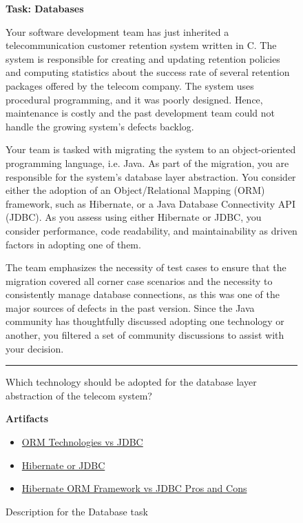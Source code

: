 \begin{figure}
\begin{mdframed}[backgroundcolor=gray!04] 
\begin{scriptsize}

{\large \textbf{Task: Databases}} \bigskip


Your software development team has just inherited a telecommunication customer retention system written in C. The system is responsible for creating and updating retention policies and computing
statistics about the success rate of several retention packages offered by the telecom company. The system uses procedural programming, and it was poorly designed. Hence, maintenance is costly and the
past development team could not handle the growing system's defects backlog. \medskip


Your team is tasked with migrating the system to an object-oriented programming language, i.e. Java. As part of the migration, you are responsible for the system's database layer abstraction. You consider either the adoption of an Object/Relational Mapping (ORM) framework, such as Hibernate, or a Java Database Connectivity API (JDBC). As you assess using either Hibernate or JDBC, you consider performance,
code readability, and maintainability as driven factors in adopting one of them.  \medskip

The team emphasizes the necessity of test cases to ensure that the migration covered all corner case scenarios and the necessity to consistently manage database connections, as this was one of the major sources of defects in the past version. Since the Java community has thoughtfully discussed adopting one technology or another, you filtered a set of community discussions to assist with your decision.


\begin{center}
\rule{10cm}{0.4pt}
\end{center}

Which technology should be adopted for the database layer abstraction of the telecom system?

\medskip

\textbf{Artifacts}

\begin{itemize}
    \item \href{https://stackoverflow.com/questions/1575762/orm-technologies-vs-jdbc}{ORM Technologies vs JDBC}
    \item \href{https://stackoverflow.com/questions/1353137/hibernate-or-jdbc}{Hibernate or JDBC}
    \item \href{https://stackoverflow.com/questions/35955020/hibernate-orm-framework-vs-jdbc-pros-and-cons}{Hibernate ORM Framework vs JDBC Pros and Cons}
\end{itemize}

\end{scriptsize}
\end{mdframed}
\caption{Description for the Database task}
\end{figure}

    
